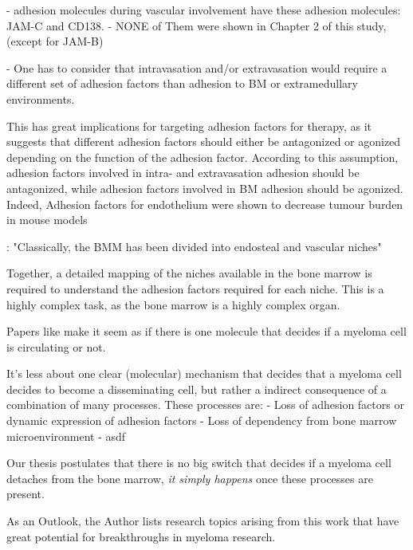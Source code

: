 - adhesion molecules during vascular involvement have these adhesion molecules: JAM-C
and CD138.
- NONE of Them were shown in Chapter 2 of this study, (except for JAM-B)


- One has to consider that intravasation and/or extravasation would require a different
set of adhesion factors than adhesion to BM or extramedullary environments.

This has great implications for targeting adhesion factors for therapy, as it
suggests that different adhesion factors should either be antagonized or
agonized depending on the function of the adhesion factor. According to this
assumption, adhesion factors involved in intra- and extravasation adhesion should be
antagonized, while adhesion factors involved in BM adhesion  should be agonized. Indeed, Adhesion factors for endothelium
were shown to decrease tumour burden in mouse models \cite{asosinghUniquePathwayHoming2001a,mrozikTherapeuticTargetingNcadherin2015}

\citet{bouzerdanAdhesionMoleculesMultiple2022}: "Classically, the BMM has been
divided into endosteal and vascular niches"

Together, a detailed mapping of the niches available in the bone marrow is required
to understand the adhesion factors required for each niche. This is a highly
complex task, as the bone marrow is a highly complex organ.



%
\label{sec:discussion_many_small_switches}%

Papers like \citet{akhmetzyanovaDynamicCD138Surface2020} make it seem as if
there is one molecule that decides if a myeloma cell is circulating or not.

It's less about one clear (molecular) mechanism that decides that a myeloma cell
decides to become a disseminating cell, but rather a indirect consequence of a combination of many
processes.
These processes are:
- Loss of adhesion factors or dynamic expression of adhesion factors
- Loss of dependency from bone marrow microenvironment
- asdf

Our thesis postulates that there is no big switch that decides if a myeloma cell
detaches from the bone marrow, \emph{it simply happens} once these processes are
present.


\label{sec:discussion_potential_breakthroughs}
As an Outlook, the Author lists research topics arising from this work that have
great potential for breakthroughs in myeloma research.

